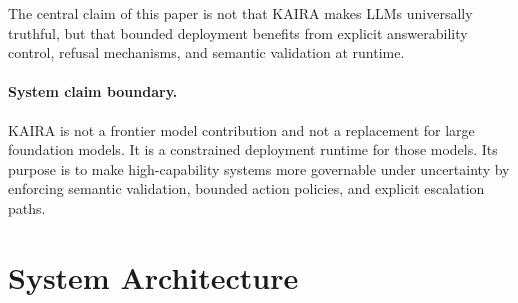 \documentclass[11pt,a4paper]{article}
\begin{document}
The central claim of this paper is not that KAIRA makes LLMs universally truthful, but that bounded deployment benefits from explicit answerability control, refusal mechanisms, and semantic validation at runtime.

\paragraph{System claim boundary.} KAIRA is not a frontier model contribution and not a replacement for large foundation models. It is a constrained deployment runtime for those models. Its purpose is to make high-capability systems more governable under uncertainty by enforcing semantic validation, bounded action policies, and explicit escalation paths.

\appendix
\section{System Architecture}
\end{document}
